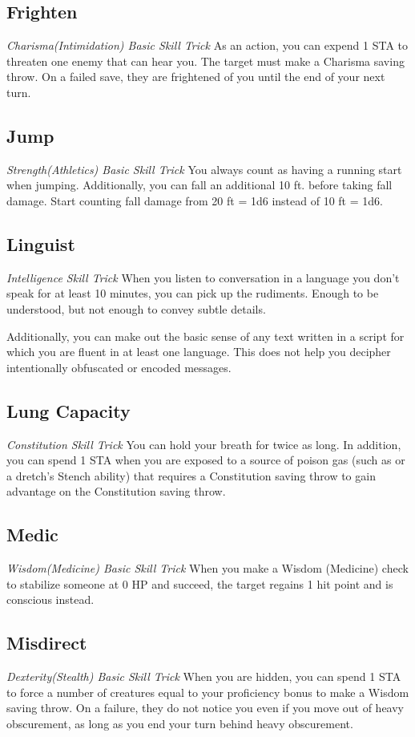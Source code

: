 \subsection{Frighten} \label{st:frighten}
\textit{Charisma(Intimidation) Basic Skill Trick}
As an action, you can expend 1 STA to threaten one enemy that can hear you. The target must make a Charisma saving throw. On a failed save, they are frightened of you until the end of your next turn.

\subsection{Jump}
\textit{Strength(Athletics) Basic Skill Trick}
You always count as having a running start when jumping. Additionally, you can fall an additional 10 ft. before taking fall damage. Start counting fall damage from 20 ft = 1d6 instead of 10 ft = 1d6.

\subsection{Linguist}
\textit{Intelligence Skill Trick}
When you listen to conversation in a language you don't speak for at least 10 minutes, you can pick up the rudiments. Enough to be understood, but not enough to convey subtle details.

Additionally, you can make out the basic sense of any text written in a script for which you are fluent in at least one language. This does not help you decipher intentionally obfuscated or encoded messages.

\subsection{Lung Capacity}
\textit{Constitution Skill Trick}
You can hold your breath for twice as long. In addition, you can spend 1 STA when you are exposed to a source of poison gas (such as  or a dretch's Stench ability) that requires a Constitution saving throw to gain advantage on the Constitution saving throw. 

\subsection{Medic}
\textit{Wisdom(Medicine) Basic Skill Trick}
When you make a Wisdom (Medicine) check to stabilize someone at 0 HP and succeed, the target regains 1 hit point and is conscious instead.

\subsection{Misdirect}
\textit{Dexterity(Stealth) Basic Skill Trick}
When you are hidden, you can spend 1 STA to force a number of creatures equal to your proficiency bonus to make a Wisdom saving throw. On a failure, they do not notice you even if you move out of heavy obscurement, as long as you end your turn behind heavy obscurement.


